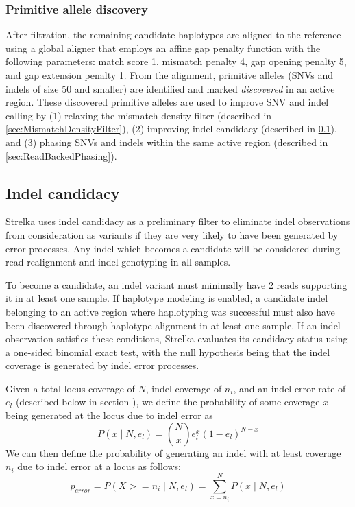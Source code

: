 \documentclass{article}
\begin{document}
\subsubsection{Primitive allele discovery}
After filtration, the remaining candidate haplotypes are aligned to the reference using a global aligner that employs an affine gap penalty function with the following parameters: match score 1, mismatch penalty 4, gap opening penalty 5, and gap extension penalty 1. From the alignment, primitive alleles (SNVs and indels of size 50 and smaller) are identified and marked {\em discovered} in an active region. These discovered primitive alleles are used to improve SNV and indel calling by (1) relaxing the mismatch density filter (described in \ref{sec:MismatchDensityFilter}), (2) improving indel candidacy (described in \ref{sec:IndelCandidacy}), and (3) phasing SNVs and indels within the same active region (described in \ref{sec:ReadBackedPhasing}).

\subsection{Indel candidacy}
\label{sec:IndelCandidacy}

Strelka uses indel candidacy as a preliminary filter to eliminate indel observations from consideration as variants if they are very likely to have been generated by error processes. Any indel which becomes a candidate will be considered during read realignment and indel genotyping in all samples.

To become a candidate, an indel variant must minimally have 2 reads supporting it in at least one sample. If haplotype modeling is enabled, a candidate indel belonging to an active region where haplotyping was successful must also have been discovered through haplotype alignment in at least one sample. If an indel observation satisfies these conditions, Strelka evaluates its candidacy status using a one-sided binomial exact test, with the null hypothesis being that the indel coverage is generated by indel error processes.

Given a total locus coverage of $N$, indel coverage of $n_i$, and an indel error rate of $e_l$ (described below in section ), we define the probability of some coverage $x$ being generated at the locus due to indel error as
\begin{equation*}
P(x \mid N, e_l) = \binom {N} {x} e^{x}_l (1 - e_l)^{N - x}
\end{equation*}
We can then define the probability of generating an indel with at least coverage $n_i$ due to indel error at a locus as follows:
\begin{equation*}
p_{error} = P(X >= n_i \mid N, e_l) = \sum_{x = n_i}^{N} P(x \mid N, e_l)
\end{equation*}
\end{document}
